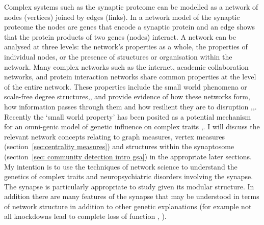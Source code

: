 \label{sec:intro large scale structure of networks from paper}
Complex systems such as the synaptic proteome can be modelled as a network of nodes (vertices) joined by edges (links). In a network model of the synaptic proteome the nodes are genes that encode a synaptic protein and an edge shows that the protein products of two genes (nodes) interact. A network can be analysed at three levels: the network’s properties as a whole, the properties of individual nodes, or the presence of structures or organisation within the network.  \cite{newman2012communities}   
Many complex networks such as the internet, academic collaboration networks, and protein interaction networks share common properties at the level of the entire network. These properties include the small world phenomena or scale-free degree structures\cite{barabasi1999emergence},\cite{watts1998collective},  and provide evidence of how these networks form, how information passes through them and how resilient they are to disruption \cite{rosvall2008maps},\cite{albert2000error},\cite{bianconi2001competition}.  Recently the `small world property’ has been posited as a potential mechanism for an omni-genic model of genetic influence on complex traits \cite{watts1998collective},\cite{boyle2017expanded}.  I will discuss the relevant network concepts relating to graph measures, vertex measures (section~\ref{sec:centrality measures}) and structures within the synaptosome (section~\ref{sec: community detection intro gsa}) in the appropriate later sections. My intention is to use the techniques of network science to understand the genetics of complex traits and neuropsychiatric disorders involving the synapse. The synapse is particularly appropriate to study given its modular structure. In addition there are many features of the synapse that may be understood in terms of network structure in addition to other genetic explanations (for example  not all knockdowns lead to complete loss of function \cite{keverne1997evaluation},  \cite{charlesworth2016canalization}).

